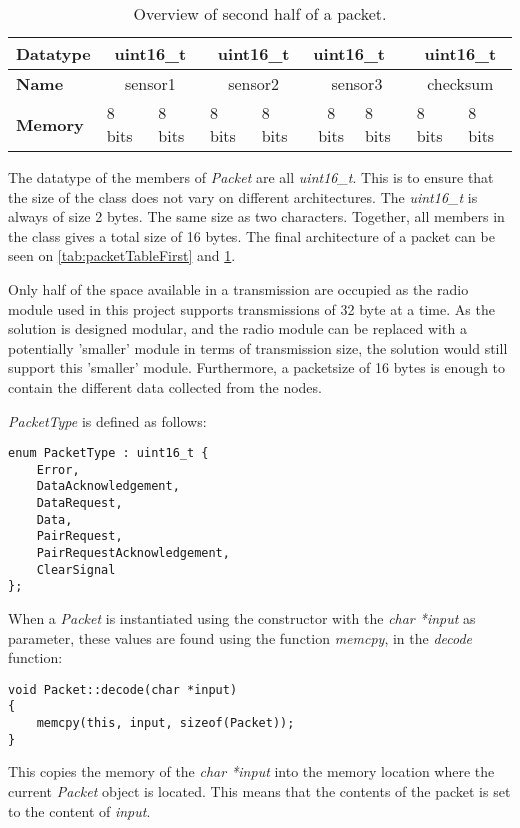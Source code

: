 \begin{table}[]
\centering
\begin{tabular}{|l|c|l|c|l|c|l|c|l|}
\hline
\textbf{Datatype} & \multicolumn{2}{c|}{uint16\_t}       & \multicolumn{2}{c|}{uint16\_t}       & \multicolumn{2}{l|}{uint16\_t} & \multicolumn{2}{c|}{uint16\_t}       \\ \hline
\textbf{Name}     & \multicolumn{2}{c|}{sensor1}         & \multicolumn{2}{c|}{sensor2}         & \multicolumn{2}{c|}{sensor3}   & \multicolumn{2}{c|}{checksum}        \\ \hline
\textbf{Memory}   & \multicolumn{1}{l|}{8 bits} & 8 bits & \multicolumn{1}{l|}{8 bits} & 8 bits & 8 bits         & 8 bits        & \multicolumn{1}{l|}{8 bits} & 8 bits \\ \hline
\end{tabular}
\caption{Overview of second half of a packet.}
\label{tab:packetTableSecond}
\end{table}

The datatype of the members of \textit{Packet} are all \textit{uint16\_t}. This is to ensure that the size of the class does not vary on different architectures. The \textit{uint16\_t} is always of size 2 bytes. The same size as two characters. Together, all members in the class gives a total size of 16 bytes. The final architecture of a packet can be seen on \ref{tab:packetTableFirst} and \ref{tab:packetTableSecond}.

Only half of the space available in a transmission are occupied as the radio module used in this project supports transmissions of 32 byte at a time. As the solution is designed modular, and the radio module can be replaced with a potentially 'smaller' module in terms of transmission size, the solution would still support this 'smaller' module. Furthermore, a packetsize of 16 bytes is enough to contain the different data collected from the nodes.

\textit{PacketType} is defined as follows:
\begin{lstlisting}
enum PacketType : uint16_t {
    Error,
    DataAcknowledgement,
    DataRequest,
    Data,
    PairRequest,
    PairRequestAcknowledgement,
    ClearSignal
};
\end{lstlisting}


When a \textit{Packet} is instantiated using the constructor with the \textit{char *input} as parameter, these values are found using the function \textit{memcpy}, in the \textit{decode} function:
\begin{lstlisting}
void Packet::decode(char *input)
{
    memcpy(this, input, sizeof(Packet));
}
\end{lstlisting}
This copies the memory of the \textit{char *input} into the memory location where the current \textit{Packet} object is located. This means that the contents of the packet is set to the content of \textit{input}.

